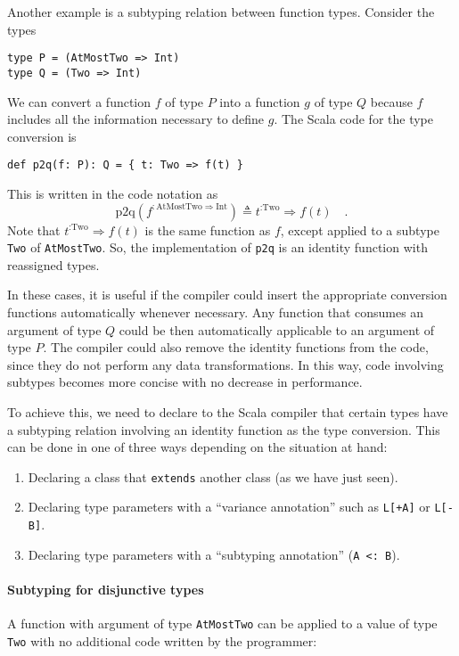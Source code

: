 Another example is a subtyping relation between function types. Consider
the types
\begin{lstlisting}
type P = (AtMostTwo => Int)
type Q = (Two => Int)
\end{lstlisting}
We can convert a function $f$ of type $P$ into a function $g$ of
type $Q$ because $f$ includes all the information necessary to define
$g$. The Scala code for the type conversion is
\begin{lstlisting}
def p2q(f: P): Q = { t: Two => f(t) }
\end{lstlisting}
This is written in the code notation as
\[
\text{p2q}(f^{:\text{AtMostTwo}\Rightarrow\text{Int}})\triangleq t^{:\text{Two}}\Rightarrow f(t)\quad.
\]
Note that $t^{:\text{Two}}\Rightarrow f(t)$ is the same function
as $f$, except applied to a subtype \lstinline!Two! of \lstinline!AtMostTwo!.
So, the implementation of \lstinline!p2q! is an identity function
with reassigned types.

In these cases, it is useful if the compiler could insert the appropriate
conversion functions automatically whenever necessary. Any function
that consumes an argument of type $Q$ could be then automatically
applicable to an argument of type $P$. The compiler could also remove
the identity functions from the code, since they do not perform any
data transformations. In this way, code involving subtypes becomes
more concise with no decrease in performance.

To achieve this, we need to declare to the Scala compiler that certain
types have a subtyping relation involving an identity function as
the type conversion. This can be done in one of three ways depending
on the situation at hand:
\begin{enumerate}
\item Declaring a class that \lstinline!extends! another class (as we have
just seen).
\item Declaring type parameters with a ``variance annotation'' such as
\lstinline!L[+A]! or \lstinline!L[-B]!.
\item Declaring type parameters with a ``subtyping annotation'' (\lstinline!A <: B!).
\end{enumerate}

\paragraph{Subtyping for disjunctive types }

A function with argument of type \lstinline!AtMostTwo! can be applied
to a value of type \lstinline!Two! with no additional code written
by the programmer:

